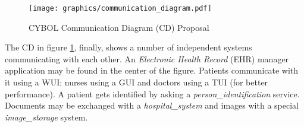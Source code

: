 \begin{figure}[ht]
    \begin{center}
        \texttt{[image: graphics/communication\_diagram.pdf]}
        \caption{CYBOL Communication Diagram (CD) Proposal}
        \label{communication_diagram_figure}
    \end{center}
\end{figure}

The CD in figure \ref{communication_diagram_figure}, finally, shows a number of independent systems
communicating with each other. An \emph{Electronic Health Record} (EHR) manager
application may be found in the center of the figure. Patients communicate with
it using a WUI; nurses using a GUI and doctors using a TUI (for better
performance). A patient gets identified by asking a \emph{person\_identification}
service. Documents may be exchanged with a \emph{hospital\_system} and images
with a special \emph{image\_storage} system.
